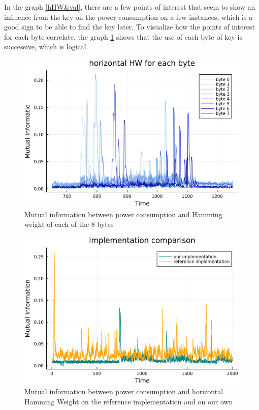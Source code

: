 \documentclass[11pt,technote]{IEEEtran}
\begin{document}
		In the graph \ref{hHW&val}, there are a few points of interest that seem to show an influence from the key on the power consumption on a few instances, which is a good sign to be able to find the key later. To visualize how the points of interest for each byte correlate, the graph \ref{hHW8_zoom} shows that the use of each byte of key is successive, which is logical. 
		
		\begin{figure}[h]
			\centering
			\includegraphics[scale=0.4]{img_files/hHW_8_bytes_zoom}
			\caption{Mutual information between power consumption and Hamming weight of each of the 8 bytes}
			\label{hHW8_zoom}
		\end{figure}

		\begin{figure}[h]
			\centering
			\includegraphics[scale=0.4]{img_files/comp_ref_hHW}
			\caption{Mutual information between power consumption and horizontal Hamming Weight on the reference implementation and on our own}
			\label{compref}
		\end{figure}
		
\end{document}
